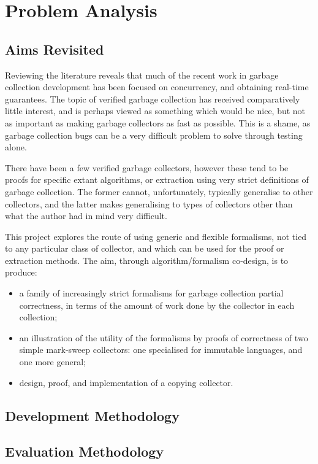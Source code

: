 \chapter{Problem Analysis}

\section{Aims Revisited}

Reviewing the literature reveals that much of the recent work in
garbage collection development has been focused on concurrency, and
obtaining real-time guarantees. The topic of verified garbage
collection has received comparatively little interest, and is perhaps
viewed as something which would be nice, but not as important as
making garbage collectors as fast as possible. This is a shame, as
garbage collection bugs can be a very difficult problem to solve
through testing alone.

There have been a few verified garbage collectors, however these tend
to be proofs for specific extant algorithms, or extraction using very
strict definitions of garbage collection. The former cannot,
unfortunately, typically generalise to other collectors, and the
latter makes generalising to types of collectors other than what the
author had in mind very difficult.

This project explores the route of using generic and flexible
formalisms, not tied to any particular class of collector, and which
can be used for the proof or extraction methods. The aim, through
algorithm/formalism co-design, is to produce:

\begin{itemize}
  \item a family of increasingly strict formalisms for garbage
    collection partial correctness, in terms of the amount of work
    done by the collector in each collection;

  \item an illustration of the utility of the formalisms by proofs of
    correctness of two simple mark-sweep collectors: one specialised
    for immutable languages, and one more general;

  \item design, proof, and implementation of a copying collector.
\end{itemize}

\section{Development Methodology}


\section{Evaluation Methodology}

